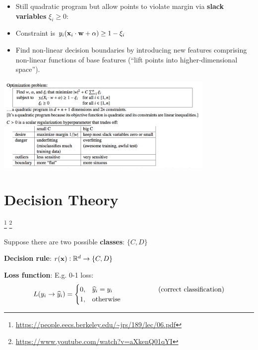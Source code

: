 \begin{itemize}
\item Still quadratic program but allow points to violate margin via
  \textbf{slack variables} $\xi_i \geq 0$:
\item Constraint is $y_i(\mathbf x_i \cdot \mathbf w + \alpha) \geq 1 - \xi_i$
\item Find non-linear decision boundaries by introducing new features
  comprising non-linear functions of base features (``lift points into
  higher-dimensional space'').
\end{itemize}

\includegraphics[width=300pt]{img/machine-learning-svm-1.png}




\newpage
\section{Decision Theory}
\footnote{\url{https://people.eecs.berkeley.edu/~jrs/189/lec/06.pdf}}
\footnote{\url{https://www.youtube.com/watch?v=aXkenQ01qYI}}

Suppose there are two possible \textbf{classes}: $\{C, D\}$

\textbf{Decision rule}: $r(\mathbf x): \mathbb{R}^d \to \{C, D\}$

\textbf{Loss function}: E.g. 0-1 loss:
\begin{align*}
  L(y_i \to \widehat y_i) =
  \begin{cases}
    0, & \widehat y_i = y_i ~~~~~~~~~~~~~~~~~~~~\text{(correct classification)}\\
    1, & \text{otherwise}
  \end{cases}
\end{align*}

